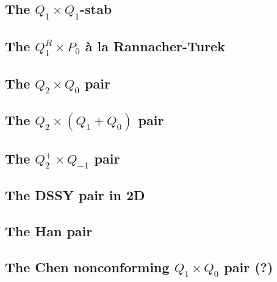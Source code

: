\subsection{The $Q_1\times Q_1$-stab}


\subsection{The $Q_1^R\times P_0$ {\`a} la Rannacher-Turek \label{ss:RTq1p0}}


\subsection{The $Q_2\times Q_0$ pair} \label{ss:pairq2q0}


\subsection{The ${ Q}_2\times (Q_1+Q_0)$ pair} \label{ss:q2q1q0}


\subsection{The ${ Q}_2^+\times Q_{-1}$ pair} \label{ss:q2pqm1}


\subsection{The DSSY pair in 2D} \label{ss:pair_dssy2D}


\subsection{The Han pair} \label{ss:han}


\subsection{The Chen nonconforming ${ Q}_1\times Q_0$ pair (?)} \label{ss:chenq0}


